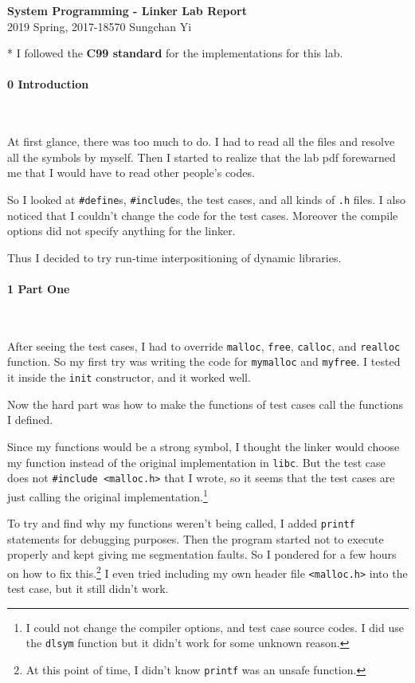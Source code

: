 \documentclass[12pt]{report}
\begin{document}
\begin{center}
\textbf{\Large System Programming - Linker Lab Report}\\
\large 2019 Spring, 2017-18570 Sungchan Yi
\end{center}
* I followed the \textbf{C99 standard} for the implementations for this lab.

\paragraph*{\large 0 Introduction}~

At first glance, there was too much to do. I had to read all the files and resolve all the symbols by myself. Then I started to realize that the lab pdf forewarned me that I would have to read other people's codes.

So I looked at \texttt{\#define}s, \texttt{\#include}s, the test cases, and all kinds of \texttt{.h} files. I also noticed that I couldn't change the code for the test cases. Moreover the compile options did not specify anything for the linker.

Thus I decided to try run-time interpositioning of dynamic libraries.

\paragraph*{\large 1 Part One}~

After seeing the test cases, I had to override \texttt{malloc}, \texttt{free}, \texttt{calloc}, and \texttt{realloc} function. So my first try was writing the code for \texttt{mymalloc} and \texttt{myfree}.
I tested it inside the \texttt{init} constructor, and it worked well.

Now the hard part was how to make the functions of test cases call the functions I defined.

Since my functions would be a strong symbol, I thought the linker would choose my function instead of the original implementation in \texttt{libc}. But the test case does not \texttt{\#include <malloc.h>} that I wrote, so it seems that the test cases are just calling the original implementation.\footnote{I could not change the compiler options, and test case source codes. I did use the \texttt{dlsym} function but it didn't work for some unknown reason.}

To try and find why my functions weren't being called, I added \texttt{printf} statements for debugging purposes. Then the program started not to execute properly and kept giving me segmentation faults. So I pondered for a few hours on how to fix this.\footnote{At this point of time, I didn't know \texttt{printf} was an unsafe function.} I even tried including my own header file \texttt{<malloc.h>} into the test case, but it still didn't work.
\end{document}
